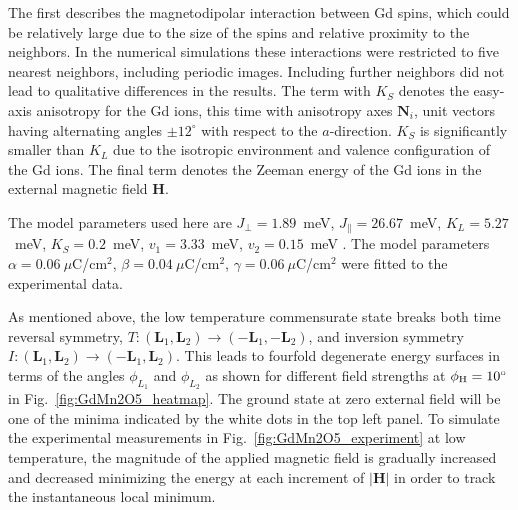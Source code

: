 The first describes the magnetodipolar interaction between Gd spins, which could be relatively large due to the size of the spins and relative proximity to the neighbors. In the numerical simulations these interactions were restricted to five nearest neighbors, including periodic images. Including further neighbors did not lead to qualitative differences in the results. The term with $K_S$ denotes the easy-axis anisotropy for the Gd ions, this time with anisotropy axes $\mathbf{N}_i$, unit vectors having alternating angles $\pm 12^\circ$ with respect to the $a$-direction. $K_S$ is significantly smaller than $K_L$ due to the isotropic environment and valence configuration of the Gd ions.
The final term denotes the Zeeman energy of the Gd ions in the external magnetic field $\mathbf{H}$.

The model parameters used here are $J_\perp = 1.89$~meV, $J_\parallel = 26.67$~meV, $K_L = 5.27$~meV, $K_S = 0.2$~meV, $v_1 = 3.33$~meV, $v_2 = 0.15$~meV . 
The model parameters $\alpha = 0.06\:\mu$C/cm$^2$, $\beta = 0.04\:\mu$C/cm$^2$, $\gamma = 0.06\:\mu$C/cm$^2$ were fitted to the experimental data.

As mentioned above, the low temperature commensurate state breaks both time reversal symmetry, $T: (\mathbf{L}_1, \mathbf{L}_2) \rightarrow (-\mathbf{L}_1, -\mathbf{L}_2)$, and inversion symmetry $I:(\mathbf{L}_1, \mathbf{L}_2) \rightarrow (-\mathbf{L}_1, \mathbf{L}_2)$.
This leads to fourfold degenerate energy surfaces in terms of the angles $\phi_{L_1}$ and $\phi_{L_2}$ as shown for different field strengths at $\phi_{\rm H} = 10^\circ$ in Fig.~\ref{fig:GdMn2O5_heatmap}. The ground state at zero external field will be one of the minima indicated by the white dots in the top left panel. 
To simulate the experimental measurements in Fig.~\ref{fig:GdMn2O5_experiment} at low temperature, the magnitude of the applied magnetic field is gradually increased and decreased minimizing the energy at each increment of $|\mathbf{H}|$ in order to track the instantaneous local minimum. 

